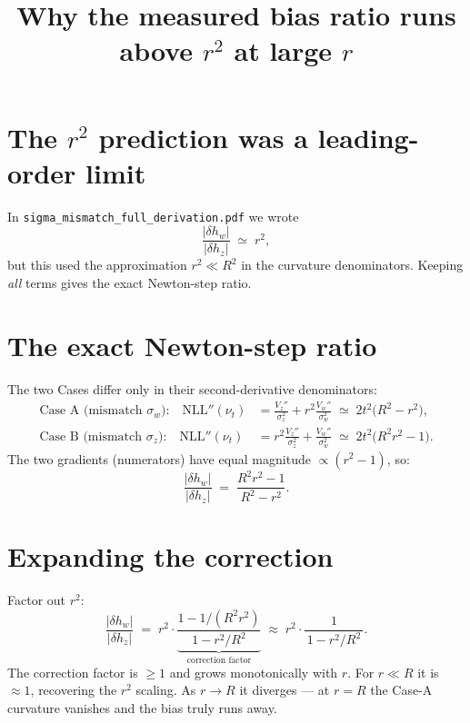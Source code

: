 \documentclass[11pt]{article}
\title{Why the measured bias ratio runs above $r^2$ at large $r$}
\author{}
\date{}
\begin{document}
\maketitle

\section*{The $r^2$ prediction was a leading-order limit}

In \texttt{sigma\_mismatch\_full\_derivation.pdf} we wrote
\begin{equation}
\frac{|\delta h_w|}{|\delta h_z|} \;\simeq\; r^2,
\end{equation}
but this used the approximation $r^2 \ll R^2$ in the curvature denominators. Keeping
\emph{all} terms gives the exact Newton-step ratio.

\section*{The exact Newton-step ratio}

The two Cases differ only in their second-derivative denominators:
\begin{align}
\text{Case A (mismatch $\sigma_w$):}\quad
\mathrm{NLL}''(\nu_t) &= \frac{V_z''}{\sigma_z^2} + r^2\frac{V_w''}{\sigma_w^2}
  \;\simeq\; 2t^2\bigl(R^2 - r^2\bigr),\\[4pt]
\text{Case B (mismatch $\sigma_z$):}\quad
\mathrm{NLL}''(\nu_t) &= r^2\frac{V_z''}{\sigma_z^2} + \frac{V_w''}{\sigma_w^2}
  \;\simeq\; 2t^2\bigl(R^2 r^2 - 1\bigr).
\end{align}
The two gradients (numerators) have equal magnitude $\propto (r^2-1)$, so:
\begin{equation}
\boxed{\;
\frac{|\delta h_w|}{|\delta h_z|} \;=\; \frac{R^2 r^2 - 1}{R^2 - r^2}.
\;}
\label{eq:exact}
\end{equation}

\section*{Expanding the correction}

Factor out $r^2$:
\begin{equation}
\frac{|\delta h_w|}{|\delta h_z|}
\;=\; r^2 \cdot
\underbrace{\frac{1 - 1/(R^2 r^2)}{1 - r^2/R^2}}_{\text{correction factor}}
\;\approx\; r^2 \cdot \frac{1}{\,1 - r^2/R^2\,}.
\label{eq:correction}
\end{equation}
The correction factor is $\geq 1$ and grows monotonically with $r$. For $r\ll R$ it is
$\approx 1$, recovering the $r^2$ scaling. As $r\to R$ it diverges — at $r=R$ the
Case-A curvature vanishes and the bias truly runs away.
\end{document}
